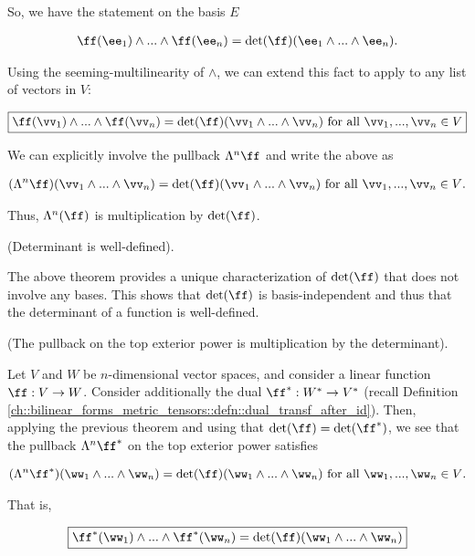 \begin{theorem}
   So, we have the statement on the basis $E$
   
   \begin{align*}
        \ff(\ee_1) \wedge ... \wedge 
        \ff(\ee_n) = \det(\ff) (\ee_1 \wedge ... \wedge \ee_n).
   \end{align*}
   
   Using the seeming-multilinearity of $\wedge$, we can extend this fact to apply to any list of vectors in $V$:
   
   \begin{align*}
       \boxed
       {
        \ff(\vv_1) \wedge ... \wedge \ff(\vv_n) = \det(\ff) ( \vv_1 \wedge ... \wedge \vv_n ) \text{ for all $\vv_1, ..., \vv_n \in V$}
       }
   \end{align*}
   
   We can explicitly involve the pullback $\Lambda^n \ff$ and write the above as
   
   \begin{align*}
       (\Lambda^n \ff)(\vv_1 \wedge ... \wedge \vv_n) = \det(\ff) ( \vv_1 \wedge ... \wedge \vv_n ) \text{ for all $\vv_1, ..., \vv_n \in V$}.
   \end{align*}
   
   Thus, $\Lambda^n(\ff)$ is multiplication by $\det(\ff)$.
\end{theorem}

\begin{remark}
    (Determinant is well-defined).
    
    The above theorem provides a unique characterization of $\det(\ff)$ that does not involve any bases. This shows that $\det(\ff)$ is basis-independent and thus that the determinant of a function is well-defined.
\end{remark}

\begin{theorem}
\label{ch::exterior_pwrs::rmk::top_pullback_det}

    (The pullback on the top exterior power is multiplication by the determinant).
    
    Let $V$ and $W$ be $n$-dimensional vector spaces, and consider a linear function $\ff:V \rightarrow W$. Consider additionally the dual $\ff^*:W^* \rightarrow V^*$ (recall Definition \ref{ch::bilinear_forms_metric_tensors::defn::dual_transf_after_id}). Then, applying the previous theorem and using that $\det(\ff) = \det(\ff^*)$, we see that the pullback $\Lambda^n \ff^*$ on the top exterior power satisfies
    
    \begin{align*}
        (\Lambda^n \ff^*)(\ww_1 \wedge ... \wedge \ww_n) = \det(\ff) ( \ww_1 \wedge ... \wedge \ww_n ) \text{ for all $\ww_1, ..., \ww_n \in V$}.
    \end{align*}
    
    That is,
    
    \begin{align*}
        \boxed
        {
            \ff^*(\ww_1) \wedge ... \wedge \ff^*(\ww_n) = \det(\ff)(\ww_1 \wedge ... \wedge \ww_n)
        }
    \end{align*}
\end{theorem}

